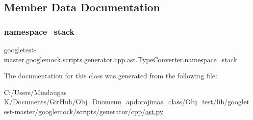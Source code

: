 \subsection{Member Data Documentation}
\mbox{\label{classgoogletest-master_1_1googlemock_1_1scripts_1_1generator_1_1cpp_1_1ast_1_1_type_converter_a538f21b1fb4b67e25f20a5aaa8d1058c}} 
\subsubsection{\texorpdfstring{namespace\_stack}{namespace\_stack}}
{\footnotesize\ttfamily googletest-\/master.\+googlemock.\+scripts.\+generator.\+cpp.\+ast.\+Type\+Converter.\+namespace\+\_\+stack}



The documentation for this class was generated from the following file\+:\begin{DoxyCompactItemize}
\item 
C\+:/\+Users/\+Mindaugas K/\+Documents/\+Git\+Hub/\+Obj\+\_\+\+Duomenu\+\_\+apdorojimas\+\_\+class/\+Obj\+\_\+test/lib/googletest-\/master/googlemock/scripts/generator/cpp/\mbox{\hyperlink{_obj__test_2lib_2googletest-master_2googlemock_2scripts_2generator_2cpp_2ast_8py}{ast.\+py}}\end{DoxyCompactItemize}
